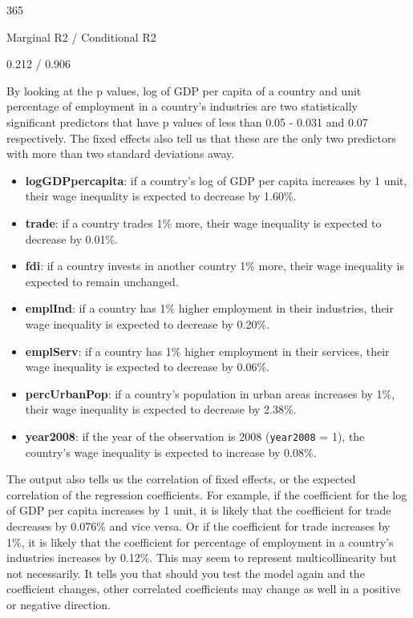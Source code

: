 \documentclass[
]{article}
\begin{document}
365

Marginal R2 / Conditional R2

0.212 / 0.906

By looking at the p values, log of GDP per capita of a country and unit
percentage of employment in a country's industries are two statistically
significant predictors that have p values of less than 0.05 - 0.031 and
0.07 respectively. The fixed effects also tell us that these are the
only two predictors with more than two standard deviations away.

\begin{itemize}
\item
  \textbf{logGDPpercapita}: if a country's log of GDP per capita
  increases by 1 unit, their wage inequality is expected to decrease by
  1.60\%.
\item
  \textbf{trade}: if a country trades 1\% more, their wage inequality is
  expected to decrease by 0.01\%.
\item
  \textbf{fdi}: if a country invests in another country 1\% more, their
  wage inequality is expected to remain unchanged.
\item
  \textbf{emplInd}: if a country has 1\% higher employment in their
  industries, their wage inequality is expected to decrease by 0.20\%.
\item
  \textbf{emplServ}: if a country has 1\% higher employment in their
  services, their wage inequality is expected to decrease by 0.06\%.
\item
  \textbf{percUrbanPop}: if a country's population in urban areas
  increases by 1\%, their wage inequality is expected to decrease by
  2.38\%.
\item
  \textbf{year2008}: if the year of the observation is 2008
  (\texttt{year2008} = 1), the country's wage inequality is expected to
  increase by 0.08\%.
\end{itemize}

The output also tells us the correlation of fixed effects, or the
expected correlation of the regression coefficients. For example, if the
coefficient for the log of GDP per capita increases by 1 unit, it is
likely that the coefficient for trade decreases by 0.076\% and vice
versa. Or if the coefficient for trade increases by 1\%, it is likely
that the coefficient for percentage of employment in a country's
industries increases by 0.12\%. This may seem to represent
multicollinearity but not necessarily. It tells you that should you test
the model again and the coefficient changes, other correlated
coefficients may change as well in a positive or negative direction.
\end{document}
